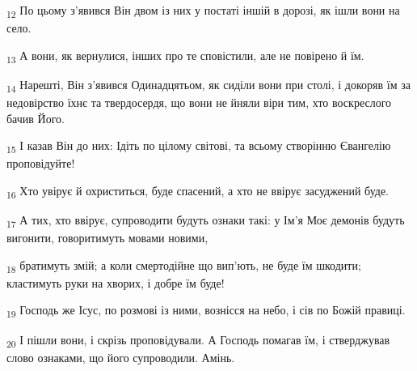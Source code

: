 \begin{tcolorbox}
\textsubscript{12} По цьому з'явився Він двом із них у постаті іншій в дорозі, як ішли вони на село.
\end{tcolorbox}
\begin{tcolorbox}
\textsubscript{13} А вони, як вернулися, інших про те сповістили, але не повірено й їм.
\end{tcolorbox}
\begin{tcolorbox}
\textsubscript{14} Нарешті, Він з'явився Одинадцятьом, як сиділи вони при столі, і докоряв їм за недовірство їхнє та твердосердя, що вони не йняли віри тим, хто воскреслого бачив Його.
\end{tcolorbox}
\begin{tcolorbox}
\textsubscript{15} І казав Він до них: Ідіть по цілому світові, та всьому створінню Євангелію проповідуйте!
\end{tcolorbox}
\begin{tcolorbox}
\textsubscript{16} Хто увірує й охриститься, буде спасений, а хто не ввірує засуджений буде.
\end{tcolorbox}
\begin{tcolorbox}
\textsubscript{17} А тих, хто ввірує, супроводити будуть ознаки такі: у Ім'я Моє демонів будуть вигонити, говоритимуть мовами новими,
\end{tcolorbox}
\begin{tcolorbox}
\textsubscript{18} братимуть змій; а коли смертодійне що вип'ють, не буде їм шкодити; кластимуть руки на хворих, і добре їм буде!
\end{tcolorbox}
\begin{tcolorbox}
\textsubscript{19} Господь же Ісус, по розмові із ними, вознісся на небо, і сів по Божій правиці.
\end{tcolorbox}
\begin{tcolorbox}
\textsubscript{20} І пішли вони, і скрізь проповідували. А Господь помагав їм, і стверджував слово ознаками, що його супроводили. Амінь.
\end{tcolorbox}
